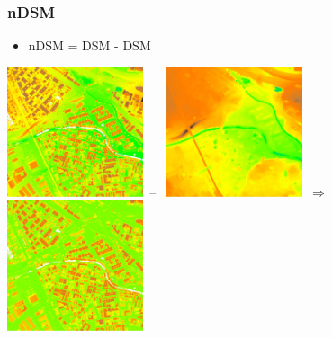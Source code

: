 \begin{frame}
  \frametitle{nDSM}
    \begin{itemize}
      \item \alert{nDSM = DSM - DSM}
    \end{itemize}
    \begin{center}
      \includegraphics[width=0.30\textwidth]{images/n_dsm}~--~
      \includegraphics[width=0.30\textwidth]{images/n_dtm}~$\Rightarrow$~
      \includegraphics[width=0.30\textwidth]{images/n_ndsm}~
    \end{center}
\end{frame}
